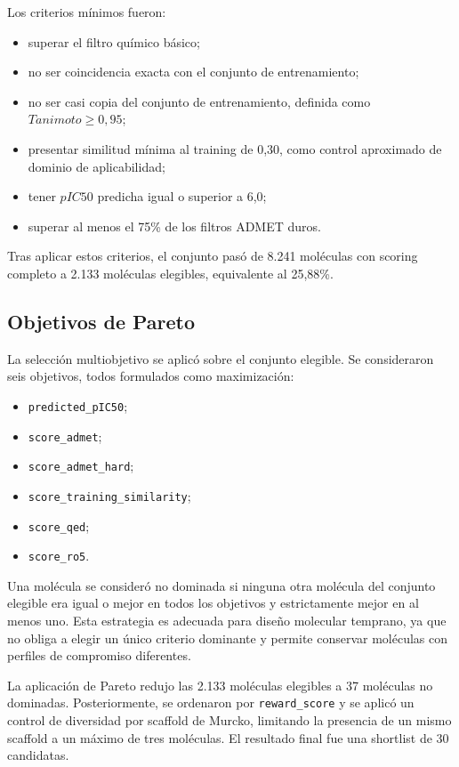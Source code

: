\documentclass[IB]{TFUOC}%
\begin{document}
Los criterios mínimos fueron:

\begin{itemize}
    \item superar el filtro químico básico;
    \item no ser coincidencia exacta con el conjunto de entrenamiento;
    \item no ser casi copia del conjunto de entrenamiento, definida como $Tanimoto \geq 0,95$;
    \item presentar similitud mínima al training de 0,30, como control aproximado de dominio de aplicabilidad;
    \item tener $pIC50$ predicha igual o superior a 6,0;
    \item superar al menos el 75\% de los filtros ADMET duros.
\end{itemize}

Tras aplicar estos criterios, el conjunto pasó de 8.241 moléculas con scoring completo a 2.133 moléculas elegibles, equivalente al 25,88\%.

\subsection{Objetivos de Pareto}

La selección multiobjetivo se aplicó sobre el conjunto elegible. Se consideraron seis objetivos, todos formulados como maximización:

\begin{itemize}
    \item \texttt{predicted\_pIC50};
    \item \texttt{score\_admet};
    \item \texttt{score\_admet\_hard};
    \item \texttt{score\_training\_similarity};
    \item \texttt{score\_qed};
    \item \texttt{score\_ro5}.
\end{itemize}

Una molécula se consideró no dominada si ninguna otra molécula del conjunto elegible era igual o mejor en todos los objetivos y estrictamente mejor en al menos uno. Esta estrategia es adecuada para diseño molecular temprano, ya que no obliga a elegir un único criterio dominante y permite conservar moléculas con perfiles de compromiso diferentes.

La aplicación de Pareto redujo las 2.133 moléculas elegibles a 37 moléculas no dominadas. Posteriormente, se ordenaron por \texttt{reward\_score} y se aplicó un control de diversidad por scaffold de Murcko, limitando la presencia de un mismo scaffold a un máximo de tres moléculas. El resultado final fue una shortlist de 30 candidatas.
\end{document}

